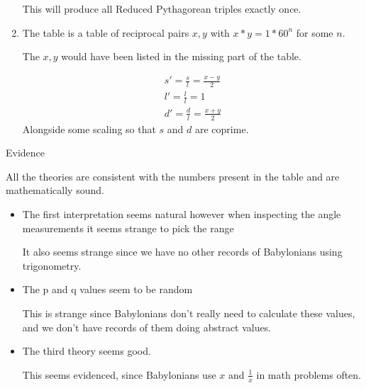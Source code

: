 \documentclass{report}
\begin{document}
\begin{description}
\begin{mdframed}
\begin{enumerate}
\begin{mdframed}
                        This will produce all Reduced Pythagorean triples
                        exactly once.
                    \end{mdframed}
                \item The table is a table of reciprocal pairs
                    $x,y$ with  $x*y = 1*60^n$ for some $n$.

                    The $x,y$ would have been listed in the
                    missing part of the table.
                    \begin{mdframed}
                        \begin{gather}
                            s' = \frac{s}{l} = \frac{x-y}{2}\\ 
                            l' = \frac{l}{l} = 1\\
                            d' = \frac{d}{l} = \frac{x+y}{2}
                        \end{gather}
                        Alongside some scaling so that
                        $s$ and $d$ are coprime.
                    \end{mdframed}
            \end{enumerate}
        \end{mdframed}
    \item Evidence
        \begin{mdframed}
            All the theories are consistent with the numbers
            present in the table and are mathematically sound.
        \end{mdframed}
        \begin{mdframed}
            \begin{itemize}
                \item The first interpretation seems natural
                    however when inspecting the angle measurements
                    it seems strange to pick the range

                    It also seems strange since we have no other
                    records of Babylonians using trigonometry.
                \item The p and q values seem to be random

                    This is strange since Babylonians don't
                    really need to calculate these values,
                    and we don't have records of them
                    doing abstract values.
                \item The third theory seems good.

                    This seems evidenced, since Babylonians
                    use $x$ and  $\frac{1}{x}$ in math problems
                    often.
            \end{itemize}
        \end{mdframed}
\end{description}
\end{document}
